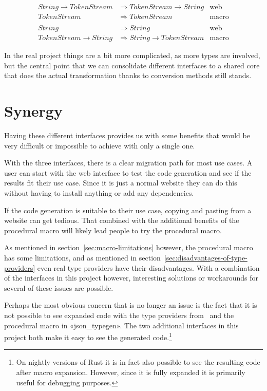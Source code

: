 \begin{align*}
String \rightarrow TokenStream &\Rightarrow TokenStream \rightarrow String & \text{web} \\
                   TokenStream &\Rightarrow TokenStream                    & \text{macro} \\
\\
                        String &\Rightarrow String                         & \text{web} \\
TokenStream \rightarrow String &\Rightarrow String \rightarrow TokenStream & \text{macro}
\end{align*}

In the real project things are a bit more complicated, as more types are involved, but the central point that we can consolidate different interfaces to a shared core that does the actual transformation thanks to conversion methods still stands.

\section{Synergy}

Having these different interfaces provides us with some benefits that would be very difficult or impossible to achieve with only a single one.

With the three interfaces, there is a clear migration path for most use cases. A user can start with the web interface to test the code generation and see if the results fit their use case. Since it is just a normal website they can do this without having to install anything or add any dependencies.

If the code generation is suitable to their use case, copying and pasting from a website can get tedious. That combined with the additional benefits of the procedural macro will likely lead people to try the procedural macro.

As mentioned in section~\ref{sec:macro-limitations} however, the procedural macro has some limitations, and as mentioned in section~\ref{sec:disadvantages-of-type-providers} even real type providers have their disadvantages. With a combination of the interfaces in this project however, interesting solutions or workarounds for several of these issues are possible.

Perhaps the most obvious concern that is no longer an issue is the fact that it is not possible to see expanded code with the type providers from \fsharpdata\ and the procedural macro in «json_typegen». The two additional interfaces in this project both make it easy to see the generated code.\footnote{On nightly versions of Rust it is in fact also possible to see the resulting code after macro expansion. However, since it is fully expanded it is primarily useful for debugging purposes.}

